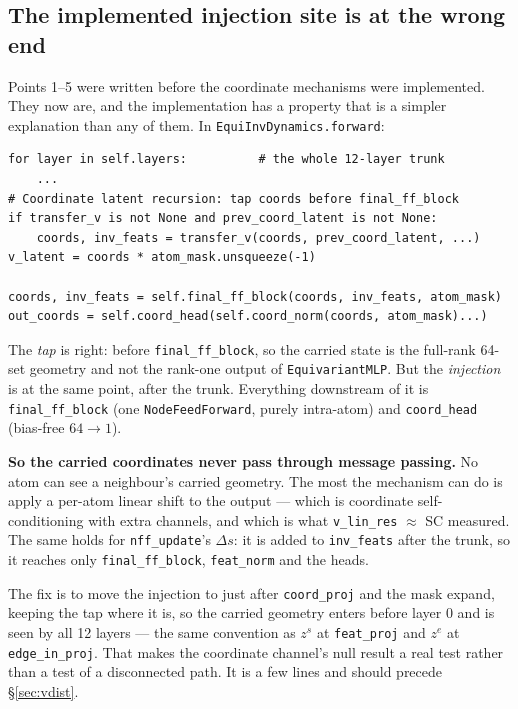\documentclass[11pt,a4paper]{article}
\newcommand{\zs}{z^{s}}
\newcommand{\ze}{z^{e}}
\newcommand{\code}[1]{\texttt{#1}}
\begin{document}
\subsection{The implemented injection site is at the wrong end}\label{sec:vsite}

Points 1--5 were written before the coordinate mechanisms were implemented. They now
are, and the implementation has a property that is a simpler explanation than any of
them. In \code{EquiInvDynamics.forward}:

\begin{lstlisting}
for layer in self.layers:          # the whole 12-layer trunk
    ...
# Coordinate latent recursion: tap coords before final_ff_block
if transfer_v is not None and prev_coord_latent is not None:
    coords, inv_feats = transfer_v(coords, prev_coord_latent, ...)
v_latent = coords * atom_mask.unsqueeze(-1)

coords, inv_feats = self.final_ff_block(coords, inv_feats, atom_mask)
out_coords = self.coord_head(self.coord_norm(coords, atom_mask)...)
\end{lstlisting}

The \emph{tap} is right: before \code{final\_ff\_block}, so the carried state is the
full-rank 64-set geometry and not the rank-one output of \code{EquivariantMLP}. But the
\emph{injection} is at the same point, after the trunk. Everything downstream of it is
\code{final\_ff\_block} (one \code{NodeFeedForward}, purely intra-atom) and
\code{coord\_head} (bias-free $64\to1$).

\textbf{So the carried coordinates never pass through message passing.} No atom can see
a neighbour's carried geometry. The most the mechanism can do is apply a per-atom linear
shift to the output --- which is coordinate self-conditioning with extra channels, and
which is what \code{v\_lin\_res} $\approx$ SC measured. The same holds for
\code{nff\_update}'s $\Delta s$: it is added to \code{inv\_feats} after the trunk, so it
reaches only \code{final\_ff\_block}, \code{feat\_norm} and the heads.

The fix is to move the injection to just after \code{coord\_proj} and the mask expand,
keeping the tap where it is, so the carried geometry enters before layer 0 and is seen by
all 12 layers --- the same convention as $\zs$ at \code{feat\_proj} and $\ze$ at
\code{edge\_in\_proj}. That makes the coordinate channel's null result a real test rather
than a test of a disconnected path. It is a few lines and should precede
\S\ref{sec:vdist}.
\end{document}
